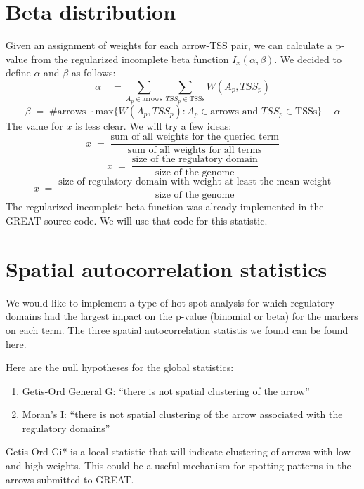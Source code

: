 \documentclass{article}
\begin{document}
\section{Beta distribution}
Given an assignment of weights for each arrow-TSS pair, we can calculate a
p-value from the regularized incomplete beta function $I_x(\alpha, \beta)$.
We decided to define $\alpha$ and $\beta$ as follows:
\[
\alpha\quad = \sum_{A_p\in\text{arrows}}\sum_{TSS_p\in\text{TSSs}}W(A_p,TSS_p)
\]
\[
\beta\;=\;\#\text{arrows }\cdot\text{max}\{W(A_p,TSS_p) :
A_p\in\text{arrows}\text{ and } TSS_p\in\text{TSSs}\} - \alpha
\]
The value for $x$ is less clear. We will try a few ideas:
\[
x\;=\;\frac{\text{sum of all weights for the queried term}}{\text{sum of all weights for
all terms}}
\]
\[
x\;=\;\frac{\text{size of the regulatory domain}}{\text{size of the genome}}
\]
\[
x\;=\;\frac{\text{size of regulatory domain with weight at least the mean
weight}}{\text{size of the genome}}
\]
The regularized incomplete beta function was already implemented in the GREAT
source code. We will use that code for this statistic.

\section{Spatial autocorrelation statistics}
We would like to implement a type of hot spot analysis for which regulatory
domains had the largest impact on the p-value (binomial or beta) for the markers
on each term. The three spatial autocorrelation statistis we found can be found
\href{http://www.sce.lsu.edu/cego/documents/reviews/geospatial/spatial_autocorrelation.pdf}{here}.

Here are the null hypotheses for the global statistics:
\begin{enumerate}[1.]
  \item Getis-Ord General G: ``there is not spatial clustering of the arrow''
  \item Moran's I: ``there is not spatial clustering of the arrow associated
    with the regulatory domains''
\end{enumerate}
Getis-Ord Gi* is a local statistic that will indicate clustering of arrows with
low and high weights. This could be a useful mechanism for spotting patterns in
the arrows submitted to GREAT.
\end{document}

